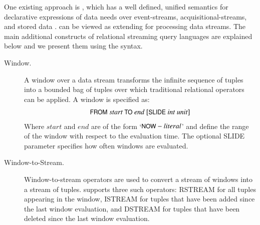 One existing approach is \sneeql, which has a well defined, unified semantics for declarative expressions of data needs over event-streams, acquisitional-streams, and stored data \cite{Brenninkmeijer_08}.
\sneeql can be viewed as extending \sql for processing data streams.
The main additional constructs of relational streaming query languages are explained below and we present them using the \sneeql syntax. 
\begin{description}
\item[Window.] A window over a data stream transforms the infinite sequence of tuples into a bounded bag of tuples over which traditional relational operators can be applied. A window is specified as: 
\begin{align*}
\textsf{\small{FROM}}\ {start}\ \textsf{\small{TO}}\ {end}\ [\textsf{\small{SLIDE}}\ {int}\ {unit}]
\end{align*}
Where ${start}$ and ${end}$ are of the form `$\textsf{\small{NOW}} - {literal}$' and define the range of the window with respect to the evaluation time. The optional \textsf{\small{SLIDE}} parameter specifies how often windows are evaluated.

\item[Window-to-Stream.] Window-to-stream operators are used to convert a stream of windows into a stream of tuples. \sneeql supports three such operators: \textsf{\small{RSTREAM}} for all tuples appearing in the window, \textsf{\small{ISTREAM}} for tuples that have been added since the last window evaluation, and \textsf{\small{DSTREAM}} for tuples that have been deleted since the last window evaluation.
\end{description}



